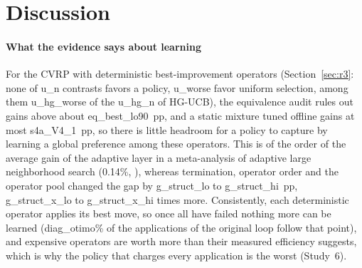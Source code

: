 \section{Discussion}\label{sec:discussion}

\paragraph{What the evidence says about learning}
For the CVRP with deterministic best-improvement operators (Section~\ref{sec:r3}: none of \num{u_n} contrasts favors a policy, \num{u_worse} favor uniform selection, among them \num{u_hg_worse} of the \num{u_hg_n} of HG-UCB), the equivalence audit rules out gains above about \num{eq_best_lo90}~pp, and a static mixture tuned offline gains at most \num{s4a_V4_1}~pp, so there is little headroom for a policy to capture by learning a global preference among these operators. This is of the order of the average gain of the adaptive layer in a meta-analysis of adaptive large neighborhood search (0.14\%, \citealp{turkes2021}), whereas termination, operator order and the operator pool changed the gap by \num{g_struct_lo} to \num{g_struct_hi}~pp, \num{g_struct_x_lo} to \num{g_struct_x_hi} times more. Consistently, each deterministic operator applies its best move, so once all have failed nothing more can be learned (\num{diag_otimo}\% of the applications of the original loop follow that point), and expensive operators are worth more than their measured efficiency suggests, which is why the policy that charges every application is the worst (Study~6).

